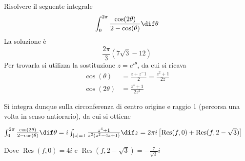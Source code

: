     Risolvere il seguente integrale \[\int_0^{2 \pi} \frac{\cos(2\theta)}{2 - \cos(\theta)}\dif \theta\]
    La soluzione è \[
        \frac{2 \pi}{3}(7 \sqrt{3} -12 )
    \]Per trovarla si utilizza la sostituzione $z = e^{i \theta}$, da cui si ricava
    \begin{align*}
        \cos(\theta) &= \frac{z + z^-1}{2} = \frac{z^2+1}{2z}\\
        \cos(2\theta) &= \frac{z^4+1}{2z^2}
    \end{align*}

    Si integra dunque sulla circonferenza di centro origine e raggio 1 (percorsa una volta in senso antiorario), da cui si ottiene

        $\int_0^{2 \pi} \frac{\cos(2\theta)}{2 - \cos(\theta)}\dif \theta = i \int_{|z| = 1} \frac{z^4+1}{z^2(z^2-4z+1)} \dif z = 2 \pi i \left[ \operatorname{Res}(f,0) + \operatorname{Res}(f,2-\sqrt{3}) \right]$

    Dove $\operatorname{Res}(f,0) = 4i$ e $ \operatorname{Res}(f,2-\sqrt{3}) = -\frac{7}{\sqrt{3}}i $
